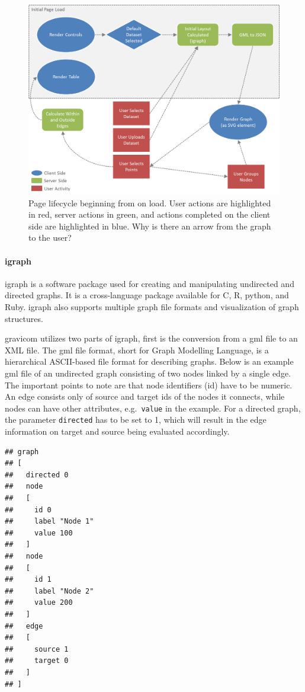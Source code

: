 \documentclass{article}\usepackage[]{graphicx}\usepackage[]{color}
\makeatletter
\newenvironment{kframe}{%
 \def\at@end@of@kframe{}%
 \ifinner\ifhmode%
  \def\at@end@of@kframe{\end{minipage}}%
  \begin{minipage}{\columnwidth}%
 \fi\fi%
 \def\FrameCommand##1{\hskip\@totalleftmargin \hskip-\fboxsep
 \colorbox{shadecolor}{##1}\hskip-\fboxsep
     \hskip-\linewidth \hskip-\@totalleftmargin \hskip\columnwidth}%
 \MakeFramed {\advance\hsize-\width
   \@totalleftmargin\z@ \linewidth\hsize
   \@setminipage}}%
 {\par\unskip\endMakeFramed%
 \at@end@of@kframe}
\newenvironment{knitrout}{}{} %
\newcommand{\hh}[1]{{\color{magenta} #1}}
\makeatother
\begin{document}
\begin{figure}[hbtp]
\centering
\includegraphics[width=\textwidth]{images/pagelifecycle.png}
\caption{\label{fig:pagelifecycle} Page lifecycle beginning from on load. User actions are highlighted in red, server actions in green, and actions completed on the client side are highlighted in blue. \hh{Why is there an arrow from the graph to the user?}}
\end{figure}


\paragraph{igraph}

igraph \cite{gc-igraph} is a software package used for creating and manipulating undirected and directed graphs. It is a cross-language package available for C, R, python, and Ruby. igraph also supports multiple graph file formats and visualization of graph structures.

gravicom utilizes two parts of igraph, first is the conversion from a gml file to an XML file. The gml file format, short for Graph Modelling Language, is a hierarchical ASCII-based file format for describing graphs. Below is an example gml file of an undirected graph consisting of two nodes linked by a single edge. The important points to note are that  node identifiers (id) have to be numeric. An edge consists only of source and target ids of the nodes it connects, while  nodes can have other attributes, e.g.~{\tt value} in the example. \hh{For a directed graph, the parameter {\tt directed} has to be set to 1, which will result in the edge information on target and source being evaluated accordingly.}
\begin{knitrout}
\color{fgcolor}\begin{kframe}
\begin{verbatim}
## graph
## [
##   directed 0
##   node
##   [
##     id 0
##     label "Node 1"
##     value 100
##   ]
##   node
##   [
##     id 1
##     label "Node 2"
##     value 200
##   ]
##   edge
##   [
##     source 1
##     target 0
##   ]
## ]
\end{verbatim}
\end{kframe}
\end{knitrout}
\end{document}
